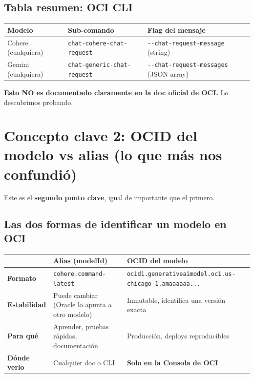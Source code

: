 \documentclass[11pt,a4paper,oneside]{article}
\begin{document}
\subsection{Tabla resumen: OCI CLI}

\begin{center}
\small
\begin{tabular}{@{}lll@{}}
\toprule
\textbf{Modelo} & \textbf{Sub-comando} & \textbf{Flag del mensaje} \\
\midrule
\rowcolor{blue!10}
Cohere (cualquiera) & \texttt{chat-cohere-chat-request} & \texttt{-{}-chat-request-message} (string) \\
Gemini (cualquiera)  & \texttt{chat-generic-chat-request} & \texttt{-{}-chat-request-messages} (JSON array) \\
\bottomrule
\end{tabular}
\end{center}

\textbf{Esto NO es documentado claramente en la doc oficial de OCI.} Lo descubrimos probando.

\section{Concepto clave 2: OCID del modelo vs alias (lo que m\'as nos confundi\'o)}

Este es el \textbf{segundo punto clave}, igual de importante que el primero.

\subsection{Las dos formas de identificar un modelo en OCI}

\begin{center}
\begin{tabular}{@{}p{3.5cm}p{5.5cm}p{5.5cm}@{}}
\toprule
 & \textbf{Alias (modelId)} & \textbf{OCID del modelo} \\
\midrule
\rowcolor{blue!10}
\textbf{Formato} & \texttt{cohere.command-latest} & \texttt{ocid1.generativeaimodel.oc1.us-chicago-1.amaaaaaa...} \\
\textbf{Estabilidad} & Puede cambiar (Oracle lo apunta a otro modelo) & Inmutable, identifica una versi\'on exacta \\
\rowcolor{blue!10}
\textbf{Para qu\'e} & Aprender, pruebas r\'apidas, documentaci\'on & Producci\'on, deploys reproducibles \\
\textbf{D\'onde verlo} & Cualquier doc o CLI & \textbf{Solo en la Consola de OCI} \\
\bottomrule
\end{tabular}
\end{center}
\end{document}
